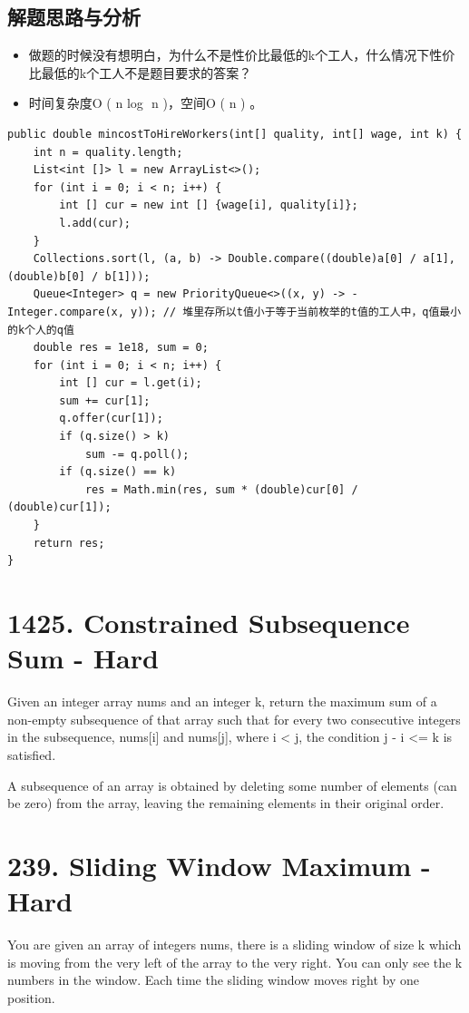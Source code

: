 \documentclass[9pt, b5paaper]{book}
\begin{document}
\subsection{解题思路与分析}
\label{sec-12-9-1}
\begin{itemize}
\item 做题的时候没有想明白，为什么不是性价比最低的k个工人，什么情况下性价比最低的k个工人不是题目要求的答案？
\item 时间复杂度O ( n log ⁡ n )，空间O ( n ) 。
\end{itemize}
\begin{verbatim}
public double mincostToHireWorkers(int[] quality, int[] wage, int k) {
    int n = quality.length;
    List<int []> l = new ArrayList<>();
    for (int i = 0; i < n; i++) {
        int [] cur = new int [] {wage[i], quality[i]};
        l.add(cur);
    }
    Collections.sort(l, (a, b) -> Double.compare((double)a[0] / a[1], (double)b[0] / b[1]));
    Queue<Integer> q = new PriorityQueue<>((x, y) -> -Integer.compare(x, y)); // 堆里存所以t值小于等于当前枚举的t值的工人中，q值最小的k个人的q值
    double res = 1e18, sum = 0;
    for (int i = 0; i < n; i++) {
        int [] cur = l.get(i);
        sum += cur[1];
        q.offer(cur[1]);
        if (q.size() > k)
            sum -= q.poll();
        if (q.size() == k)
            res = Math.min(res, sum * (double)cur[0] / (double)cur[1]);
    }
    return res;
}
\end{verbatim}

\section{1425. Constrained Subsequence Sum - Hard}
\label{sec-12-10}
Given an integer array nums and an integer k, return the maximum sum of a non-empty subsequence of that array such that for every two consecutive integers in the subsequence, nums[i] and nums[j], where i < j, the condition j - i <= k is satisfied.

A subsequence of an array is obtained by deleting some number of elements (can be zero) from the array, leaving the remaining elements in their original order.

\section{239. Sliding Window Maximum - Hard}
\label{sec-12-11}
You are given an array of integers nums, there is a sliding window of size k which is moving from the very left of the array to the very right. You can only see the k numbers in the window. Each time the sliding window moves right by one position.
\end{document}
